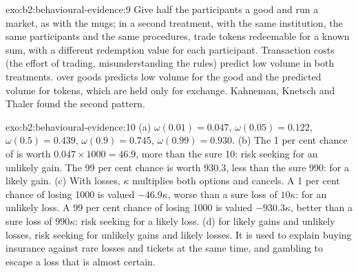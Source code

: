 \begin{solution}{exo:b2:behavioural-evidence:9}
Give half the participants a good and run a market, as with the mugs; in a second treatment, with the
same institution, the same participants and the same procedures, trade tokens redeemable for a known
sum, with a different redemption value for each participant. Transaction costs (the effort of trading,
misunderstanding the rules) predict low volume in both treatments.  over goods predicts low
volume for the good and the predicted volume for tokens, which are held only for exchange. Kahneman,
Knetsch and Thaler found the second pattern.
\end{solution}

\begin{solution}{exo:b2:behavioural-evidence:10}
(a) $\omega(0.01) = 0.047$, $\omega(0.05) = 0.122$, $\omega(0.5) = 0.439$, $\omega(0.9) = 0.745$,
$\omega(0.99) = 0.930$.
(b) The 1 per cent chance of  is worth $0.047 \times 1000 = 46.9$, more than the sure 10: risk
seeking for an unlikely gain. The 99 per cent chance is worth $930.3$, less than the sure 990:  for a likely gain.
(c) With losses, $\kappa$ multiplies both options and cancels. A 1 per cent chance of losing 1000 is
valued $-46.9\kappa$, worse than a sure loss of $10\kappa$:  for an unlikely loss. A 99 per
cent chance of losing 1000 is valued $-930.3\kappa$, better than a sure loss of $990\kappa$: risk seeking
for a likely loss.
(d)  for likely gains and unlikely losses, risk seeking for unlikely gains and likely
losses. It is used to explain buying insurance against rare losses and  tickets at the same
time, and gambling to escape a loss that is almost certain.
\end{solution}

